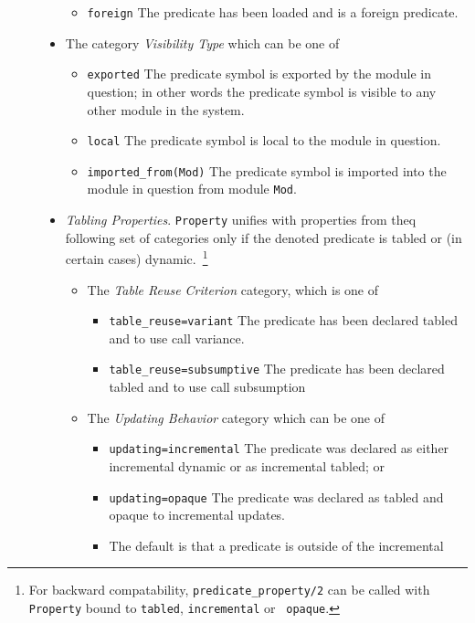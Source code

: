 \begin{description}
\begin{itemize}
\begin{itemize}
\item{\tt foreign} The predicate has been loaded and is a foreign
  predicate.
%
\end{itemize}
%
\item The category {\em Visibility Type} which can be one of
\begin{itemize}
\item{\tt exported} The predicate symbol is exported by the module in
  question; in other words the predicate symbol is visible to any
  other module in the system.
%
\item{\tt local} The predicate symbol is local to the module in
  question.
%
\item{\tt imported\_from(Mod)} The predicate symbol is imported into
  the module in question from module {\tt Mod}.
%
\end{itemize}
\item{\em Tabling Properties}.  {\tt Property} unifies with properties
  from theq following set of categories only if the denoted predicate
  is tabled or (in certain cases) dynamic.~\footnote{For backward
    compatability, {\tt predicate\_property/2} can be called with {\tt
      Property} bound to {\tt tabled}, {\tt incremental} or {\tt
      opaque}.}
%
\begin{itemize}
\item The {\em Table Reuse Criterion} category, which is one of 
\begin{itemize}
\item{\tt table\_reuse=variant} The predicate has been declared
  tabled and to use call variance.
%
\item{\tt table\_reuse=subsumptive} The predicate has been declared
  tabled and to use call subsumption
%
%
\end{itemize}
%
\item The {\em Updating Behavior} category which can be one of 
\begin{itemize}
\item{\tt updating=incremental} The predicate was declared as
  either incremental dynamic or as incremental tabled; or
%
\item{\tt updating=opaque} The predicate was declared as
  tabled and opaque to incremental updates.
%
\item The default is that a predicate is outside of the incremental

\end{itemize}
\end{itemize}
\end{itemize}
\end{description}
